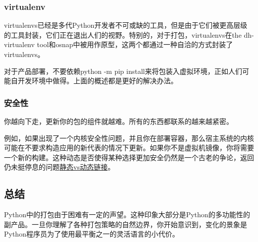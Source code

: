 \documentclass[../package_tutorial.tex]{subfiles}
\begin{document}
\subsubsection{virtualenv}

virtualenvs已经是多代Python开发者不可或缺的工具，但是由于它们被更高层级的工具封装，它们正在退出人们的视野。特别的，对于打包，virtualenvs在the dh-virtualenv tool和osnap中被用作原型，这两个都通过一种自洽的方式封装了virtualenvs。

对于产品部署，不要依赖python -m pip install来将包装入虚拟环境，正如人们可能自开发环境中做得。上面的概述都是更好的解决办法。

\subsubsection{安全性}

你越向下走，更新你的包的组件就越难。所有的东西都联系的越来越紧密。

例如，如果出现了一个内核安全性问题，并且你在部署容器，那么宿主系统的内核可能在不要求构造应用的新代表的情况下更新。如果你不是虚拟机镜像，你将需要一个新的构建。这种动态是否使得某种选择更加安全仍然是一个古老的争论，返回仍未挺停息的问题\href{https://www.google.com/search?channel=fs&q=static+vs+dynamic+linking}{静态vs动态链接}。

\subsection{总结}

Python中的打包由于困难有一定的声望。这种印象大部分是Python的多功能性的副产品。一旦你理解了各种打包策略的自然边界，你开始意识到，变化的景象是Python程序员为了使用最平衡之一的灵活语言的小代价。
\end{document}
